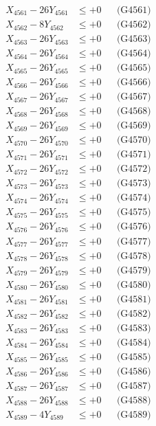 \documentclass[a4paper,10pt]{article}
\begin{document}
{\begin{align}
X_{4561} - 26Y_{4561} &\leq +0 && \text{(G4561)} \\
X_{4562} - 8Y_{4562} &\leq +0 && \text{(G4562)} \\
X_{4563} - 26Y_{4563} &\leq +0 && \text{(G4563)} \\
X_{4564} - 26Y_{4564} &\leq +0 && \text{(G4564)} \\
X_{4565} - 26Y_{4565} &\leq +0 && \text{(G4565)} \\
X_{4566} - 26Y_{4566} &\leq +0 && \text{(G4566)} \\
X_{4567} - 26Y_{4567} &\leq +0 && \text{(G4567)} \\
X_{4568} - 26Y_{4568} &\leq +0 && \text{(G4568)} \\
X_{4569} - 26Y_{4569} &\leq +0 && \text{(G4569)} \\
X_{4570} - 26Y_{4570} &\leq +0 && \text{(G4570)} \\
\allowbreak
X_{4571} - 26Y_{4571} &\leq +0 && \text{(G4571)} \\
X_{4572} - 26Y_{4572} &\leq +0 && \text{(G4572)} \\
X_{4573} - 26Y_{4573} &\leq +0 && \text{(G4573)} \\
X_{4574} - 26Y_{4574} &\leq +0 && \text{(G4574)} \\
X_{4575} - 26Y_{4575} &\leq +0 && \text{(G4575)} \\
X_{4576} - 26Y_{4576} &\leq +0 && \text{(G4576)} \\
X_{4577} - 26Y_{4577} &\leq +0 && \text{(G4577)} \\
X_{4578} - 26Y_{4578} &\leq +0 && \text{(G4578)} \\
X_{4579} - 26Y_{4579} &\leq +0 && \text{(G4579)} \\
X_{4580} - 26Y_{4580} &\leq +0 && \text{(G4580)} \\
\allowbreak
X_{4581} - 26Y_{4581} &\leq +0 && \text{(G4581)} \\
X_{4582} - 26Y_{4582} &\leq +0 && \text{(G4582)} \\
X_{4583} - 26Y_{4583} &\leq +0 && \text{(G4583)} \\
X_{4584} - 26Y_{4584} &\leq +0 && \text{(G4584)} \\
X_{4585} - 26Y_{4585} &\leq +0 && \text{(G4585)} \\
X_{4586} - 26Y_{4586} &\leq +0 && \text{(G4586)} \\
X_{4587} - 26Y_{4587} &\leq +0 && \text{(G4587)} \\
X_{4588} - 26Y_{4588} &\leq +0 && \text{(G4588)} \\
X_{4589} - 4Y_{4589} &\leq +0 && \text{(G4589)} \\

\end{align}}
\end{document}
